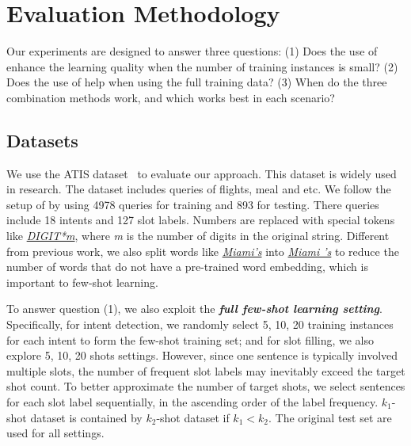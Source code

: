 \section{Evaluation Methodology}
Our experiments are designed to answer three questions: (1) Does the use of \REs enhance the learning quality when the number of training
instances is small? (2) Does the use of \REs help when using the full training data? (3) When do the three combination methods work, and
which works best in each scenario? 

\subsection{Datasets}
\label{sec_datasest}

We use the ATIS dataset~\cite{hemphill1990atis} to evaluate our approach. This dataset is widely used in \SLU research. The dataset
includes queries of flights, meal and etc. We follow the setup of \cite{liu2016attention} by using 4978 queries for training and 893 for
testing. There queries include 18 intents and 127 slot labels. Numbers are replaced with special tokens like \textsl{\underline{DIGIT*m}},
where \emph{m} is the number of digits in the original string. Different from previous work, we also split words like
\textsl{\underline{Miami's}} into \textsl{\underline{Miami 's}} to reduce the number of words that do not have a pre-trained word
embedding, which is important to few-shot learning.

To answer question (1), we also exploit the \textbf{\emph{full few-shot learning setting}}. Specifically, for intent detection, we randomly
select 5, 10, 20 training instances for each intent to form the few-shot training set; and for slot filling, we also explore 5, 10, 20
shots settings. However, since one sentence is typically involved multiple slots, the number of frequent slot labels may inevitably exceed
the target shot count. To better approximate the number of target shots, we select sentences for each slot label sequentially, in the
ascending order of the label frequency.
$k_1$-shot dataset is contained by $k_2$-shot dataset if $k_1 < k_2$.
The original test set are used for all settings.

